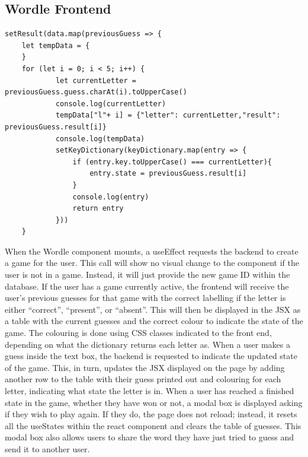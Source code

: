 \subsection{Wordle Frontend}
\begin{lstlisting}[style=python, caption={The loop that updates the results when they are received so they can be placed in the JSX}]
setResult(data.map(previousGuess => {
    let tempData = {
    }
    for (let i = 0; i < 5; i++) {
            let currentLetter = previousGuess.guess.charAt(i).toUpperCase()
            console.log(currentLetter)
            tempData["l"+ i] = {"letter": currentLetter,"result": previousGuess.result[i]}
            console.log(tempData)
            setKeyDictionary(keyDictionary.map(entry => {
                if (entry.key.toUpperCase() === currentLetter){
                    entry.state = previousGuess.result[i]
                }
                console.log(entry)
                return entry
            }))
    }
\end{lstlisting}
When the Wordle component mounts, a useEffect requests the backend to create a game for the user. This call will show no visual change to the component if the user is not in a game. Instead, it will just provide the new game ID within the database. If the user has a game currently active, the frontend will receive the user's previous guesses for that game with the correct labelling if the letter is either “correct”, “present”, or “absent”. This will then be displayed in the JSX as a table with the current guesses and the correct colour to indicate the state of the game. The colouring is done using CSS classes indicated to the front end, depending on what the dictionary returns each letter as.
When a user makes a guess inside the text box, the backend is requested to indicate the updated state of the game. This, in turn, updates the JSX displayed on the page by adding another row to the table with their guess printed out and colouring for each letter, indicating what state the letter is in.
When a user has reached a finished state in the game, whether they have won or not, a modal box is displayed asking if they wish to play again. If they do, the page does not reload; instead, it resets all the useStates within the react component and clears the table of guesses. This modal box also allows users to share the word they have just tried to guess and send it to another user. 


